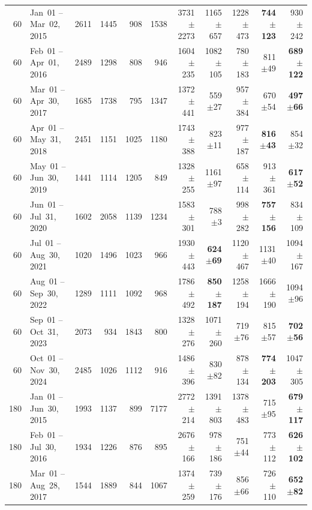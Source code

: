 \begin{longtable}{r l r r r r r r r r r}
60 & Jan~01 -- Mar~02, 2015 & 2611 & 1445 & 908 & 1538 & 3731{\tiny$\pm$2273} & 1165{\tiny$\pm$657} & 1228{\tiny$\pm$473} & \textbf{744{\tiny$\pm$123}} & 930{\tiny$\pm$242} \\
60 & Feb~01 -- Apr~01, 2016 & 2489 & 1298 & 808 & 946 & 1604{\tiny$\pm$235} & 1082{\tiny$\pm$105} & 780{\tiny$\pm$183} & 811{\tiny$\pm$49} & \textbf{689{\tiny$\pm$122}} \\
60 & Mar~01 -- Apr~30, 2017 & 1685 & 1738 & 795 & 1347 & 1372{\tiny$\pm$441} & 559{\tiny$\pm$27} & 957{\tiny$\pm$384} & 670{\tiny$\pm$54} & \textbf{497{\tiny$\pm$66}} \\
60 & Apr~01 -- May~31, 2018 & 2451 & 1151 & 1025 & 1180 & 1743{\tiny$\pm$388} & 823{\tiny$\pm$11} & 977{\tiny$\pm$187} & \textbf{816{\tiny$\pm$43}} & 854{\tiny$\pm$32} \\
60 & May~01 -- Jun~30, 2019 & 1441 & 1114 & 1205 & 849 & 1328{\tiny$\pm$255} & 1161{\tiny$\pm$97} & 658{\tiny$\pm$114} & 913{\tiny$\pm$361} & \textbf{617{\tiny$\pm$52}} \\
60 & Jun~01 -- Jul~31, 2020 & 1602 & 2058 & 1139 & 1234 & 1583{\tiny$\pm$301} & 788{\tiny$\pm$3} & 998{\tiny$\pm$282} & \textbf{757{\tiny$\pm$156}} & 834{\tiny$\pm$109} \\
60 & Jul~01 -- Aug~30, 2021 & 1020 & 1496 & 1023 & 966 & 1930{\tiny$\pm$443} & \textbf{624{\tiny$\pm$69}} & 1120{\tiny$\pm$467} & 1131{\tiny$\pm$40} & 1094{\tiny$\pm$167} \\
60 & Aug~01 -- Sep~30, 2022 & 1289 & 1111 & 1092 & 968 & 1786{\tiny$\pm$492} & \textbf{850{\tiny$\pm$187}} & 1258{\tiny$\pm$194} & 1666{\tiny$\pm$190} & 1094{\tiny$\pm$96} \\
60 & Sep~01 -- Oct~31, 2023 & 2073 & 934 & 1843 & 800 & 1328{\tiny$\pm$276} & 1071{\tiny$\pm$260} & 719{\tiny$\pm$76} & 815{\tiny$\pm$57} & \textbf{702{\tiny$\pm$56}} \\
60 & Oct~01 -- Nov~30, 2024 & 2485 & 1026 & 1112 & 916 & 1486{\tiny$\pm$396} & 830{\tiny$\pm$82} & 878{\tiny$\pm$134} & \textbf{774{\tiny$\pm$203}} & 1047{\tiny$\pm$305} \\
\midrule
180 & Jan~01 -- Jun~30, 2015 & 1993 & 1137 & 899 & 7177 & 2772{\tiny$\pm$214} & 1391{\tiny$\pm$803} & 1378{\tiny$\pm$483} & 715{\tiny$\pm$95} & \textbf{679{\tiny$\pm$117}} \\
180 & Feb~01 -- Jul~30, 2016 & 1934 & 1226 & 876 & 895 & 2676{\tiny$\pm$166} & 978{\tiny$\pm$186} & 751{\tiny$\pm$44} & 773{\tiny$\pm$112} & \textbf{626{\tiny$\pm$102}} \\
180 & Mar~01 -- Aug~28, 2017 & 1544 & 1889 & 844 & 1067 & 1374{\tiny$\pm$259} & 739{\tiny$\pm$176} & 856{\tiny$\pm$66} & 726{\tiny$\pm$110} & \textbf{652{\tiny$\pm$82}} \\

\end{longtable}
